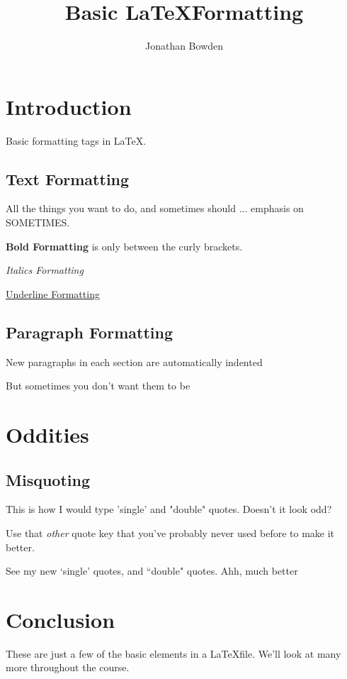 \documentclass{article}
\title{Basic \LaTeX Formatting}
\author{Jonathan Bowden}
\begin{document}
\maketitle

\section{Introduction}

Basic formatting tags in \LaTeX.

\subsection{Text Formatting}

All the things you want to do, and sometimes should ... emphasis on SOMETIMES.

\textbf{Bold Formatting} is only between the curly brackets.

\emph{Italics Formatting}

\underline{Underline Formatting}

\subsection{Paragraph Formatting}

New paragraphs in each section are automatically indented

\noindent But sometimes you don't want them to be

\section{Oddities}

\subsection{Misquoting}

This is how I would type 'single' and "double" quotes. Doesn't it look odd?

\noindent Use that \emph{other} quote key that you've probably never used before to make it better.

\noindent See my new `single' quotes, and ``double" quotes. Ahh, much better

\section{Conclusion}

These are just a few of the basic elements in a \LaTeX file. We'll look at many more throughout the course.
\end{document}
